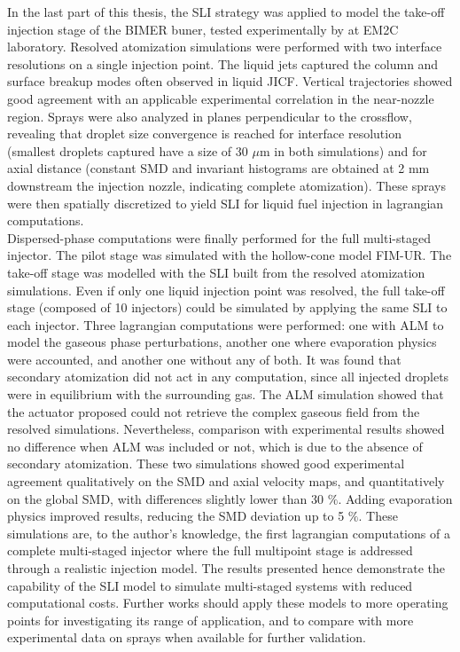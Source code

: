 In the last part of this thesis, the SLI strategy was applied to model the take-off injection stage of the BIMER buner, tested experimentally by  at EM2C laboratory. Resolved atomization simulations were performed with two interface resolutions on a single injection point. The liquid jets captured the column and surface breakup modes often observed in liquid JICF. Vertical trajectories showed good agreement with an applicable experimental correlation in the near-nozzle region. Sprays were also analyzed in planes perpendicular to the crossflow, revealing that droplet size convergence is reached for interface resolution (smallest droplets captured have a size of 30 $\mu$m in both simulations) and for axial distance (constant SMD and invariant histograms are obtained at 2 mm downstream the injection nozzle, indicating complete atomization). These sprays were then spatially discretized to yield SLI for liquid fuel injection in lagrangian computations. \\

Dispersed-phase computations were finally performed for the full multi-staged injector. The pilot stage was simulated with the hollow-cone model FIM-UR. The take-off stage was modelled with the SLI built from the resolved atomization simulations. Even if only one liquid injection point was resolved, the full take-off stage (composed of 10 injectors) could be simulated by applying the same SLI to each injector. Three lagrangian computations were performed: one with ALM to model the gaseous phase perturbations, another one where evaporation physics were accounted, and another one without any of both. It was found that secondary atomization did not act in any computation, since all injected droplets were in equilibrium with the surrounding gas. The ALM simulation showed that the actuator proposed could not retrieve the complex gaseous field from the resolved simulations. Nevertheless, comparison with experimental results showed no difference when ALM was included or not, which is due to the absence of secondary atomization. These two simulations showed good experimental agreement qualitatively on the SMD and axial velocity maps, and quantitatively on the global SMD, with differences slightly lower than 30 $\%$. Adding evaporation physics improved results, reducing the SMD deviation up to 5 $\%$. These simulations are, to the author's knowledge, the first lagrangian computations of a complete multi-staged injector where the full multipoint stage is addressed through a realistic 
injection model. The results presented hence demonstrate the capability of the SLI model to simulate multi-staged systems with reduced computational costs. Further works should apply these models to more operating points for investigating its range of application, and to compare with more experimental data on sprays when available for further validation.

